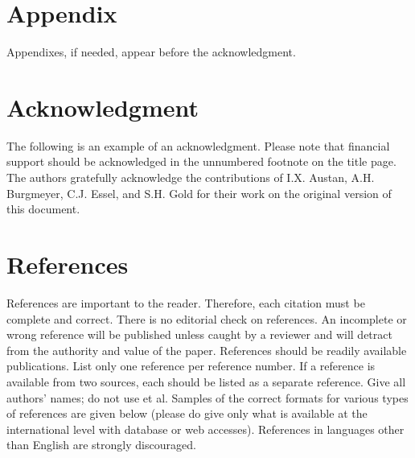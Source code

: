 \documentclass[a4paper]{IEEEtran}
\begin{document}
\section{Appendix}
Appendixes, if needed, appear before the acknowledgment. 
\section{Acknowledgment}
The following is an example of an acknowledgment. Please note that financial support should be acknowledged in the unnumbered footnote on the title page.
The authors gratefully acknowledge the contributions of I.X. Austan, A.H. Burgmeyer, C.J. Essel, and S.H. Gold for their work on the original version of this document.
\section{References}
References are important to the reader. Therefore, each citation must be complete and correct. There is no editorial check on references. An incomplete or wrong reference will be published unless caught by a reviewer and will detract from the authority and value of the paper. References should be readily available publications.
List only one reference per reference number. If a reference is available from two sources, each should be listed as a separate reference. Give all authors' names; do not use et al. 
Samples of the correct formats for various types of references are given below (please do give only what is available at the international level with database or web accesses). References in languages other than English are strongly discouraged.

\cite{bishop_neural_1995}
\cite{mas_application_2008}
\cite{melin_hybrid_2005}
\cite{kavzoglu_increasing_2009}
\cite{agatonovic-kustrin_basic_2000}



\end{document}

